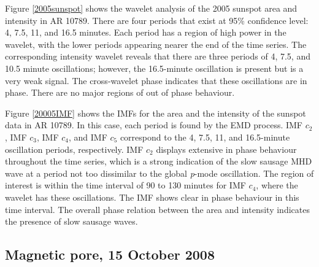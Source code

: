	Figure \ref{2005sunspot} shows the wavelet analysis of the 2005 sunspot area and intensity in AR 10789.
	There are four periods that exist at 95\% confidence level: 4, 7.5, 11, and 16.5 minutes.
	Each period has a region of high power in the wavelet, with the lower periods appearing nearer the end of the time series.
	The corresponding intensity wavelet reveals that there are three periods of 4, 7.5, and 10.5 minute oscillations; however, the 16.5-minute oscillation is present but is a very weak signal.
	The cross-wavelet phase indicates that these oscillations are in phase.
	There are no major regions of out of phase behaviour.
		
	Figure \ref{20005IMF} shows the IMFs for the area and the intensity of the sunspot data in AR 10789.
	In this case, each period is found by the EMD process. IMF $c_{2}$, IMF $c_{3}$, IMF $c_{4}$, and IMF $c_{5}$ correspond to the 4, 7.5, 11, and 16.5-minute oscillation periods, respectively.
	IMF $c_{2}$ displays extensive in phase behaviour throughout the time series, which is a strong indication of the slow sausage MHD wave at a period not too dissimilar to the global \textit{p}-mode oscillation.
	The region of interest is within the time interval of 90 to 130 minutes for IMF $c_{4}$, where the wavelet has these oscillations.
	The IMF shows clear in phase behaviour in this time interval.
	The overall phase relation between the area and intensity indicates the presence of slow sausage waves.
	
\subsection{Magnetic pore, 15 October 2008}

